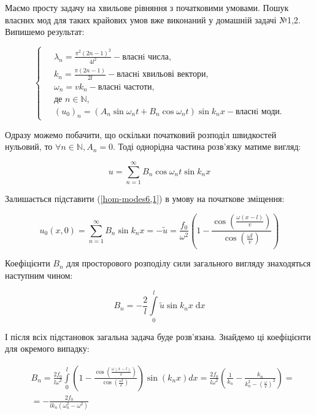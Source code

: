 Маємо просту задачу на хвильове рівняння з початковими умовами. Пошук власних мод для таких крайових умов вже виконаний у домашній задачі №1,2. Випишемо результат:

\begin{equation*} 
    \left\{ \begin{aligned}
            \;&\lambda_n = \frac{\pi^2 (2n-1)^2}{4l^2} - \text{власнi числа},\\
            &k_n = \frac{\pi (2n-1)}{2l} - \text{власнi хвильові вектори},\\
            &\omega_n=vk_n - \text{власнi частоти},\\
            &\text{де } n \in \mathbb{N},\\ 
            &{(u_0)}_n = \left(A_n\sin\omega_nt + B_n\cos\omega_nt\right)\sin k_nx - \text{власнi моди}.       
    \end{aligned} \right.
\end{equation*}

Одразу можемо побачити, що оскільки початковий розподіл швидкостей нульовий, то $\forall n \in \mathbb{N}, A_n = 0$. Тоді однорідна частина розв'язку матиме вигляд:

\begin{equation} \label{hom-modes6,1}
    u = \sum_{n=1}^\infty B_n\cos\omega_nt\sin k_nx
\end{equation}

Залишається підставити (\ref{hom-modes6,1}) в умову на початкове зміщення:

\begin{equation} 
    u_0(x,0) = \sum_{n=1}^\infty B_n\sin k_nx = -\tilde{u} = \frac{f_0}{\omega^2}\left(1 - \frac{\cos\left(\frac{\omega (x-l)}{v}\right)}{\cos\left(\frac{\omega l}{v}\right)}\right)
\end{equation}
 
Коефіцієнти $B_n$ для просторового розподілу сили загального вигляду знаходяться наступним чином:

\begin{equation} 
    B_n = -\frac{2}{l} \int\limits_0^l \tilde{u} \sin k_nx \;\mathrm{d}x
\end{equation}

І після всіх підстановок загальна задача буде розв'язана. Знайдемо ці коефіцієнти для окремого випадку:

\begin{equation} 
    \begin{aligned}
        &B_n = \frac{2f_0}{l\omega^2} \int\limits_0^l \left(1 - \frac{\cos\left(\frac{\omega(x-l)}{v}\right)}{\cos\left(\frac{\omega l}{v}\right)}\right)\sin(k_nx)dx = \frac{2f_0}{l\omega^2} \left(\frac{1}{k_n} - \frac{k_n}{k_n^2 - \left(\frac{\omega}{v}\right)^2}\right)=\\
        &= -\frac{2f_0}{lk_n \left(\omega_n^2 - \omega^2\right)}
    \end{aligned}    
\end{equation}

